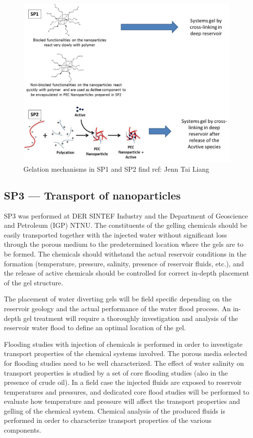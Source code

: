 \begin{figure}
    \centering
    \includegraphics[width=\textwidth]{img/fig/sp1sp2.png}
    \caption{Gelation mechanisms in SP1 and SP2 \colorbox{Apricot}{find ref: Jenn Tai Liang}}
    \label{fig:sp1sp2}
\end{figure}

\subsection*{SP3 --- Transport of nanoparticles}
%
SP3 was performed at DER SINTEF Industry and the Department of Geoscience and Petroleum (IGP) NTNU.  
The constituents of the gelling chemicals should be easily transported together with the injected water without significant loss through the porous medium to the predetermined location where the gels are to be formed. The chemicals should withstand the actual reservoir conditions in the formation (temperature, pressure, salinity, presence of reservoir fluids, etc.), and the release of active chemicals should be controlled for correct in-depth placement of the gel structure. 

The placement of water diverting gels will be field specific depending on the reservoir geology and the actual performance of the water flood process. An in-depth gel treatment will require a thoroughly investigation and analysis of the reservoir water flood to define an optimal location of the gel. 

Flooding studies with injection of chemicals is performed in order to investigate transport properties of the chemical systems involved. The porous media selected for flooding studies need to be well characterized. The effect of water salinity on transport properties is studied by a set of core flooding studies (also in the presence of crude oil). In a field case the injected fluids are exposed to reservoir temperatures and pressures, and dedicated core flood studies will be performed to evaluate how temperature and pressure will affect the transport properties and gelling of the chemical system. Chemical analysis of the produced fluids is performed in order to characterize transport properties of the various components.

